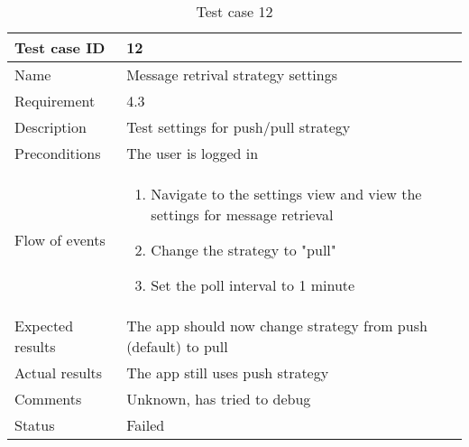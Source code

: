 		\begin{table}
			\begin{tabular}{l|p{10cm}}
				Test case ID & 12\\ \hline
				Name & Message retrival strategy settings\\ \hline
				Requirement & 4.3\\ \hline
				Description & Test settings for push/pull strategy\\ \hline
				Preconditions & The user is logged in\\ \hline
				Flow of events & 
					\begin{enumerate}
						\item{}Navigate to the settings view and view the settings for message retrieval
						\item{}Change the strategy to "pull"
						\item{}Set the poll interval to 1 minute
					\end{enumerate} \\ \hline
				Expected results & The app should now change strategy from push (default) to pull \\ \hline
				Actual results & The app still uses push strategy\\ \hline
				Comments & Unknown, has tried to debug\\ \hline
				Status & Failed\\ \hline
			\end{tabular}
			\caption{Test case 12} \label{tab:case12}
		\end{table}

